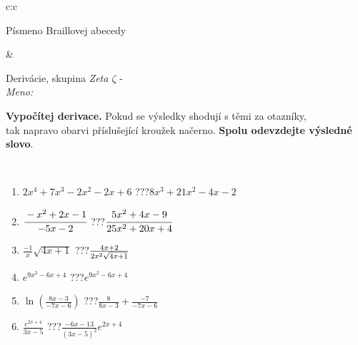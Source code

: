 \documentclass[10pt]{report}
\begin{document}
\begin{tabular}{c:c}
\begin{minipage}[c][104.5mm][t]{0.5\linewidth}
\begin{center}
\begin{minipage}{0.20\linewidth}
\begin{center}
{\small Písmeno Braillovej abecedy}
\end{center}
\end{minipage}
\end{center}
\end{minipage}
&
\begin{minipage}[c][104.5mm][t]{0.5\linewidth}
\begin{center}
\vspace{7mm}
{\huge Derivácie, skupina \textit{Zeta $\zeta$} -}\\[5mm]
\textit{Meno:}\phantom{xxxxxxxxxxxxxxxxxxxxxxxxxxxxxxxxxxxxxxxxxxxxxxxxxxxxxxxxxxxxxxxxx}\\[5mm]
\begin{minipage}{0.95\linewidth}
\begin{center}
\textbf{Vypočítej derivace.} Pokud se výsledky shodují s těmi za otazníky,\\tak napravo obarvi příslušející kroužek načerno. \textbf{Spolu odevzdejte výsledné slovo}.
\end{center}
\end{minipage}
\\[1mm]
\begin{minipage}{0.79\linewidth}
\begin{center}
\begin{varwidth}{\linewidth}
\begin{enumerate}
\normalsize
\item $2x^4+7x^3-2x^2-2x+6$\quad \dotfill\; ???\;\dotfill \quad $8x^3+21x^2-4x-2$
\item $\cfrac{-x^2+2x-1}{-5x-2}$\quad \dotfill\; ???\;\dotfill \quad $\cfrac{5x^2+4x-9}{25x^2+20x+4}$
\item $\frac{-1}{x}\sqrt{4x+1}$\quad \dotfill\; ???\;\dotfill \quad $\frac{4x+2}{2x^2 \sqrt{\smash[b]{4x+1}}}$
\item $e^{9x^2-6x+4}$\quad \dotfill\; ???\;\dotfill \quad $e^{9x^2-6x+4}$
\item $\ln{\left(\frac{8x-3}{-7x-6}\right)}$\quad \dotfill\; ???\;\dotfill \quad $\frac{8}{8x-3}+\frac{-7}{-7x-6}$
\item $\frac{e^{2x+4}}{3x-5}$\quad \dotfill\; ???\;\dotfill \quad $\frac{-6x-13}{(3x-5)^2}e^{2x+4}$
\end{enumerate}
\end{varwidth}
\end{center}
\end{minipage}
\begin{minipage}{0.20\linewidth}
\begin{center}

\end{center}
\end{minipage}
\end{center}
\end{minipage}
\end{tabular}
\end{document}
